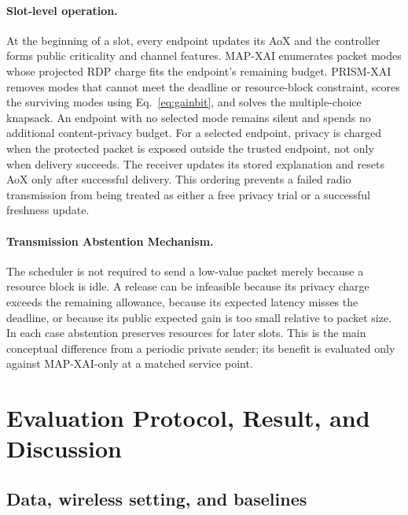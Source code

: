 \documentclass[conference]{IEEEtran}
\begin{document}
\paragraph{Slot-level operation.}
At the beginning of a slot, every endpoint updates its AoX and the controller
forms public criticality and channel features. MAP-XAI enumerates packet modes
whose projected RDP charge fits the endpoint's remaining budget. PRISM-XAI
removes modes that cannot meet the deadline or resource-block constraint,
scores the surviving modes using Eq.~\eqref{eq:gainbit}, and solves the
multiple-choice knapsack. An endpoint with no selected mode remains silent and
spends no additional content-privacy budget. For a selected endpoint, privacy
is charged when the protected packet is exposed outside the trusted endpoint,
not only when delivery succeeds. The receiver updates its stored explanation
and resets AoX only after successful delivery. This ordering prevents a failed
radio transmission from being treated as either a free privacy trial or a
successful freshness update.

\paragraph{Transmission Abstention Mechanism.}
The scheduler is not required to send a low-value packet merely because a
resource block is idle. A release can be infeasible because its privacy charge
exceeds the remaining allowance, because its expected latency misses the
deadline, or because its public expected gain is too small relative to packet
size. In each case abstention preserves resources for later slots. This is the
main conceptual difference from a periodic private sender; its benefit is
evaluated only against MAP-XAI-only at a matched service point.

\endgroup
\vspace{-2mm}
\section{Evaluation Protocol, Result, and Discussion}

\subsection{Data, wireless setting, and baselines}
\end{document}

